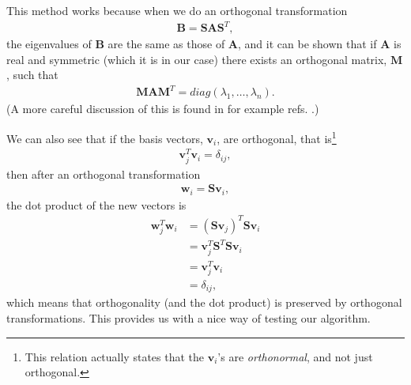 \documentclass[12pt, a4paper]{article}
\begin{document}
This method works because when we do an orthogonal transformation 
\begin{align*}
\mathbf{B} = \mathbf{SAS}^T, 
\end{align*}
the eigenvalues of $\mathbf{B}$ are the same as those of $\mathbf{A}$, and
 it can be shown that \cite{Matrix Comp} if $\mathbf{A}$ is real and symmetric
(which it is in our case) there exists an orthogonal matrix, $\mathbf{M}$, such that 
\begin{align*}
\mathbf{MAM}^T = diag(\lambda_1,\dots,\lambda_n).  
\end{align*} 
(A more careful discussion of this is found in for example refs. \cite{Matrix Comp, Lecture Notes}.) 

We can also see that if the basis vectors, $\mathbf{v}_i$, are orthogonal, that is\footnote{This relation 
actually states that the $\mathbf{v}_i$'s are \textit{orthonormal}, and not just orthogonal.} 
\begin{align*}
\mathbf{v}_j^T\mathbf{v}_i = \delta_{ij}, 
\end{align*}
then after an orthogonal transformation 
\begin{align*}
\mathbf{w}_i = \mathbf{Sv}_i,  
\end{align*} 
the dot product of the new vectors is 
\begin{align*}
\mathbf{w}_j^T\mathbf{w}_i & = (\mathbf{Sv}_j)^T \mathbf{Sv}_i \\
						   & = \mathbf{v}_j^T\mathbf{S}^T \mathbf{Sv}_i \\ 
						   & = \mathbf{v}_j^T\mathbf{v}_i \\ 
						   & = \delta_{ij}, 
\end{align*}
which means that orthogonality (and the dot product) is preserved by orthogonal transformations. This 
provides us with a nice way of testing our algorithm. 
\end{document}
